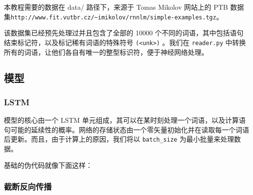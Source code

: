 本教程需要的数据在 data/ 路径下，来源于 Tomas Mikolov 网站上的 PTB
数据集\texttt{http://www.fit.vutbr.cz/\textasciitilde{}imikolov/rnnlm/simple-examples.tgz}。

该数据集已经预先处理过并且包含了全部的 10000
个不同的词语，其中包括语句结束标记符，以及标记稀有词语的特殊符号
\texttt{(\textless{}unk\textgreater{})} 。我们在 \texttt{reader.py}
中转换所有的词语，让他们各自有唯一的整型标识符，便于神经网络处理。

\subsection{模型 }\label{ux6a21ux578b}

\subsubsection{LSTM }\label{lstm}

模型的核心由一个 LSTM
单元组成，其可以在某时刻处理一个词语，以及计算语句可能的延续性的概率。网络的存储状态由一个零矢量初始化并在读取每一个词语后更新。而且，由于计算上的原因，我们将以
\texttt{batch\_size} 为最小批量来处理数据。

基础的伪代码就像下面这样：

\begin{Shaded}
\begin{Highlighting}[]
\OperatorTok{=} 
\OperatorTok{=} 

\OperatorTok{=} 
  
    \OperatorTok{=} 

    \OperatorTok{=} \OperatorTok{+} 
    \OperatorTok{=} 
    \OperatorTok{+=} 
\end{Highlighting}
\end{Shaded}

\subsubsection{截断反向传播
}\label{ux622aux65adux53cdux5411ux4f20ux64ad}

